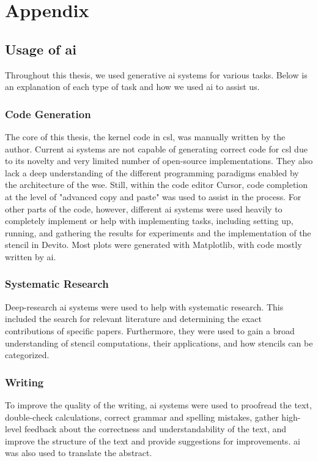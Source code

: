 \chapter{Appendix}
\section{Usage of \ac{ai}}
Throughout this thesis, we used generative \ac{ai} systems for various tasks.
Below is an explanation of each type of task and how we used \ac{ai} to assist us.

\subsection{Code Generation}
The core of this thesis, the kernel code in \ac{csl}, was manually written by the author. Current \ac{ai} systems are not capable of generating correct code for \ac{csl} due to its novelty and very limited number of open-source implementations. They also lack a deep understanding of the different programming paradigms enabled by the architecture of the \ac{wse}. Still, within the code editor Cursor, code completion at the level of "advanced copy and paste" was used to assist in the process. For other parts of the code, however, different \ac{ai} systems were used heavily to completely implement or help with implementing tasks, including setting up, running, and gathering the results for experiments and the implementation of the stencil in Devito. Most plots were generated with Matplotlib, with code mostly written by \ac{ai}.

\subsection{Systematic Research}
Deep-research \ac{ai} systems were used to help with systematic research. This included the search for relevant literature and determining the exact contributions of specific papers. Furthermore, they were used to gain a broad understanding of stencil computations, their applications, and how stencils can be categorized.

\subsection{Writing}
To improve the quality of the writing, \ac{ai} systems were used to proofread the text, double-check calculations, correct grammar and spelling mistakes, gather high-level feedback about the correctness and understandability of the text, and improve the structure of the text and provide suggestions for improvements. \ac{ai} was also used to translate the abstract.

